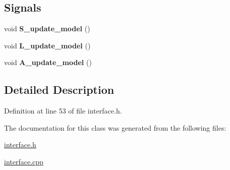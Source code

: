 \subsection*{Signals}
\begin{DoxyCompactItemize}
\item 
\mbox{\label{classinterface_a300de30478e2e2616b61abad24bf319a}} 
void {\bfseries S\+\_\+update\+\_\+model} ()
\item 
\mbox{\label{classinterface_a7d829b8bd407c58d27b0849f4891f155}} 
void {\bfseries L\+\_\+update\+\_\+model} ()
\item 
\mbox{\label{classinterface_ad09217bb805eb4405dfc8d0b7cc6e547}} 
void {\bfseries A\+\_\+update\+\_\+model} ()
\end{DoxyCompactItemize}


\subsection{Detailed Description}


Definition at line 53 of file interface.\+h.



The documentation for this class was generated from the following files\+:\begin{DoxyCompactItemize}
\item 
\hyperlink{interface_8h}{interface.\+h}\item 
\hyperlink{interface_8cpp}{interface.\+cpp}\end{DoxyCompactItemize}
